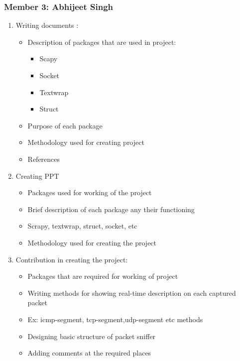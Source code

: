 \documentclass[12pt, a4paper]{report}
\begin{document}
\subsubsection{Member 3: Abhijeet Singh}
\begin{enumerate}
    \item Writing documents :
        \begin{itemize}
            \item Description of packages that are used in project:
		    \begin{itemize}
		        \item Scapy
        		\item Socket
        		\item Textwrap
        		\item Struct
		    \end{itemize}
        	\item Purpose of each package
        	\item Methodology used for creating project
        	\item References

    \end{itemize}
    
    \item Creating PPT
        \begin{itemize}
            \item Packages used for working of the project
        	\item Brief description of each package any their functioning
        	\item Scrapy, textwrap, struct, socket, etc
        	\item Methodology used for creating the project 
        
        \end{itemize}
    
    \item Contribution in creating the project:

        \begin{itemize}
            \item Packages that are required for working of project
	\item Writing methods for showing real-time description on each captured packet
	\item Ex: icmp-segment, tcp-segment,udp-segment etc methods
	\item Designing basic structure of packet sniffer 
	\item Adding comments at the required places


        \end{itemize}
\end{enumerate}
\end{document}
